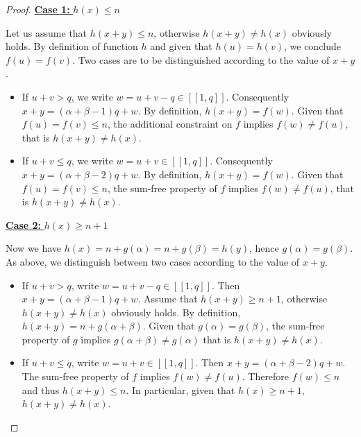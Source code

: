 \documentclass{article}
\newtheorem{computational theorem}[definition]{Computational Theorem}
\begin{document}
\begin{proof}
	\noindent \underline{\textbf{Case 1:} \(h(x) \leqslant n\)}
	\par
	Let us assume that \(h(x+y) \leqslant n\), otherwise \(h(x + y) \neq h(x)\) obviously holds. By definition of function 
	\(h\) and given that \(h(u) = h(v)\), we conclude \(f(u) = f(v)\). Two cases are to be distinguished according to the value of \(x + y\).
	
	\begin{itemize}
	\item If \(u + v > q\), we write \(w = u + v - q \in [\![1, q]\!]\). Consequently \(x + y = (\alpha + \beta - 1) q + w\). By definition, 
		\(h(x + y) = f(w)\). Given that \(f(u) = f(v) \leqslant n\), the  additional constraint on \(f\) implies \(f(w) 
		\neq f(u)\), that is \(h(x + y) \neq h(x)\).
	\item If \(u + v \leqslant q\), we write \(w = u + v \in [\![1, q]\!]\). Consequently \(x+y = (\alpha + \beta- 2) q + w\). By definition, 
		\(h(x + y) = f(w)\). Given that \(f(u) = f(v) \leqslant n\), the sum-free property of \(f\) implies \(f(w) \neq f(u)\), 
		that is \(h(x + y) \neq h(x)\).
	\end{itemize} 
	  
	\noindent \underline{\textbf{Case 2:} \(h(x) \geqslant n + 1\)}
	\par
	Now we have \(h(x) = n + g(\alpha) = 
	n + g(\beta) = h(y)\), hence \(g(\alpha) = g(\beta)\). As above, we distinguish between two cases according 
	to the value of \(x + y\).
	
	\begin{itemize}
	\item \begin{sloppypar}
		If \(u + v > q\), write \(w = u + v - q \in [\![1, q]\!]\). Then \(x + y = (\alpha + \beta - 1) q + w\). Assume that 
		\({h(x+y) \geqslant n + 1}\),  otherwise \(h(x + y) \neq h(x)\) obviously holds. By definition, \({h(x + y) = n + g(\alpha + 
		\beta)}\). Given that \(g(\alpha) = g(\beta)\), the sum-free property of \(g\) implies \(g(\alpha + \beta) 
		\neq g(\alpha)\) that is \(h(x + y) \neq h(x)\).
		\end{sloppypar}
	\item  If \(u + v \leqslant q\), write \(w = u + v \in [\![1, q]\!]\). Then \(x+y = (\alpha + \beta- 2) q + w\). The sum-free 
		property of \(f\) implies \(f(w) \neq f(u)\). Therefore \(f(w) \leqslant n\) and thus \(h(x + y) \leqslant n\). In particular,
		given that \(h(x) \geqslant n + 1\), \(h(x + y) \neq h(x)\).
	\end{itemize}
\end{proof}
\end{document}
